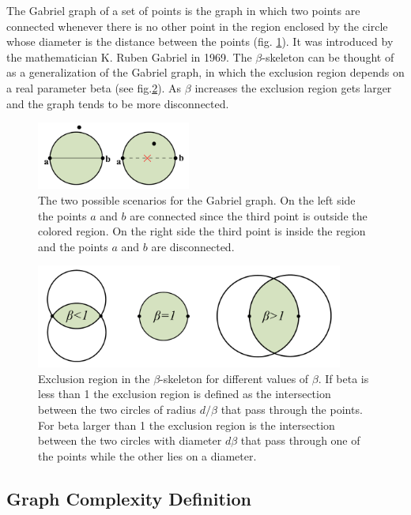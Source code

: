 \documentclass[fleqn,usenatbib]{mnras}
\begin{document}
The Gabriel graph of a set of points is the graph in which two points
are connected whenever there is no other point in the region enclosed
by the circle whose diameter is the distance between the points
(fig. \ref{fig:gabriel}).   
It was introduced by the mathematician K. Ruben Gabriel in 1969. 
The $\beta$-skeleton can be thought of as a generalization of the
Gabriel graph, in which the exclusion region depends on a real
parameter beta (see fig.\ref{fig:bskeleton_area}).   
As $\beta$ increases the exclusion  region gets larger and the graph tends to be
more disconnected.  

\begin{figure}
    \centering
    \includegraphics[width=0.45\textwidth]{gabriel.pdf}
    \caption{The two possible scenarios for the Gabriel graph. On the left side the points $a$ and $b$ are connected since the third point is outside the colored region. On the right side the third point is inside the region and the points $a$ and $b$ are disconnected.}
    \label{fig:gabriel}
\end{figure}
\begin{figure}
    \centering
    \includegraphics[width=0.9\textwidth]{betaskeleton.pdf}
    \caption{Exclusion region in the $\beta$-skeleton for different values of $\beta$. If beta is less than 1 the exclusion region is defined as the intersection between the two circles of radius $d/\beta$ that pass through the points. For beta larger than 1 the exclusion region is the intersection between the two circles with diameter $d\beta$ that pass through one of the points while the other lies on a diameter.}
    \label{fig:bskeleton_area}
\end{figure}
\subsection{Graph Complexity Definition}
\end{document}

